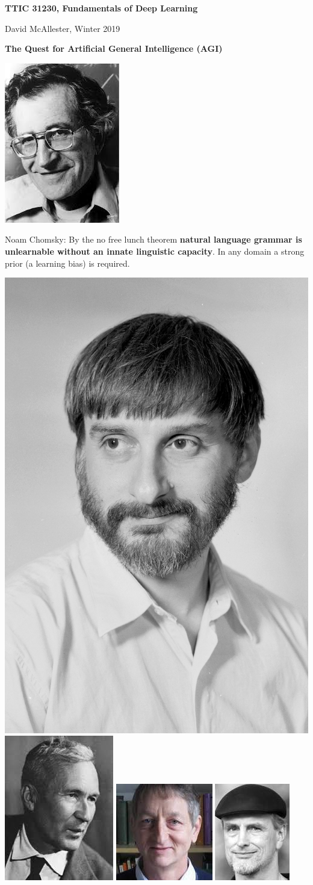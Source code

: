 




{\Huge

  \centerline{\bf TTIC 31230, Fundamentals of Deep Learning}
  \bigskip
  \centerline{David McAllester, Winter 2019}

\vfill
  \centerline{\bf The Quest for Artificial General Intelligence (AGI)}
  
  \vfill


\includegraphics[width=1.0 in]{../images/Chomsky} \begin{minipage}[b]{8in} Noam Chomsky: 
  By the no free lunch theorem {\bf natural language grammar is unlearnable without an innate linguistic capacity}. In any domain a strong prior (a learning bias)
  is required. \end{minipage}

\vfill
\includegraphics[height=1.0 in]{../images/Levin}
\includegraphics[height=1.0 in]{../images/Kolmogorov}
\includegraphics[height=1.0 in]{../images/Hinton}
\includegraphics[height=1.0 in]{../images/Schmidhuber}

}
